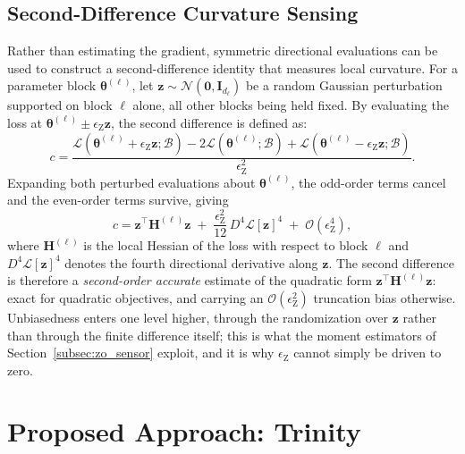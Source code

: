 \documentclass[conference]{IEEEtran}
\begin{document}
\subsection{Second-Difference Curvature Sensing}
\label{subsec:rdsa_bg}
Rather than estimating the gradient, symmetric directional evaluations can be used to construct a second-difference identity that measures local curvature. For a parameter block $\boldsymbol{\theta}^{(\ell)}$, let $\mathbf{z} \sim \mathcal{N}(\mathbf{0}, \mathbf{I}_{d_\ell})$ be a random Gaussian perturbation supported on block $\ell$ alone, all other blocks being held fixed. By evaluating the loss at $\boldsymbol{\theta}^{(\ell)} \pm \epsilon_{\mathrm{Z}} \mathbf{z}$, the second difference is defined as:
\begin{equation}
c = \frac{\mathcal{L}(\boldsymbol{\theta}^{(\ell)} + \epsilon_{\mathrm{Z}} \mathbf{z}; \mathcal{B}) - 2\mathcal{L}(\boldsymbol{\theta}^{(\ell)}; \mathcal{B}) + \mathcal{L}(\boldsymbol{\theta}^{(\ell)} - \epsilon_{\mathrm{Z}} \mathbf{z}; \mathcal{B})}{\epsilon_{\mathrm{Z}}^2}.
\label{eq:second_diff}
\end{equation}
Expanding both perturbed evaluations about $\boldsymbol{\theta}^{(\ell)}$, the odd-order terms cancel and the even-order terms survive, giving
\begin{equation}
c = \mathbf{z}^\top \mathbf{H}^{(\ell)} \mathbf{z} \;+\; \frac{\epsilon_{\mathrm{Z}}^2}{12}\,D^4\mathcal{L}[\mathbf{z}]^4 \;+\; \mathcal{O}(\epsilon_{\mathrm{Z}}^4),
\label{eq:second_diff_expansion}
\end{equation}
where $\mathbf{H}^{(\ell)}$ is the local Hessian of the loss with respect to block $\ell$ and $D^4\mathcal{L}[\mathbf{z}]^4$ denotes the fourth directional derivative along $\mathbf{z}$. The second difference is therefore a \emph{second-order accurate} estimate of the quadratic form $\mathbf{z}^\top \mathbf{H}^{(\ell)} \mathbf{z}$: exact for quadratic objectives, and carrying an $\mathcal{O}(\epsilon_{\mathrm{Z}}^2)$ truncation bias otherwise. Unbiasedness enters one level higher, through the randomization over $\mathbf{z}$ rather than through the finite difference itself; this is what the moment estimators of Section~\ref{subsec:zo_sensor} exploit, and it is why $\epsilon_{\mathrm{Z}}$ cannot simply be driven to zero.

\section{Proposed Approach: Trinity}
\label{sec:method}
\end{document}
